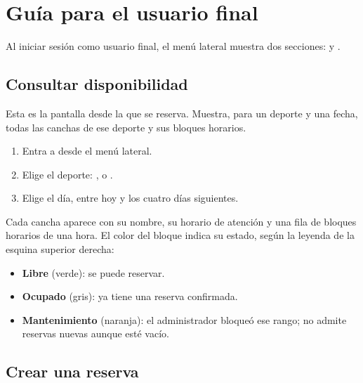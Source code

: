 
\section{Guía para el usuario final}
\label{sec:usuario-final}

Al iniciar sesión como usuario final, el menú lateral muestra dos
secciones:  y .

\subsection{Consultar disponibilidad}
\label{sec:usuario:disponibilidad}

Esta es la pantalla desde la que se reserva. Muestra, para un deporte y una
fecha, todas las canchas de ese deporte y sus bloques horarios.

\begin{enumerate}
  \item Entra a  desde el menú lateral.
  \item Elige el deporte: ,  o .
  \item Elige el día, entre hoy y los cuatro días siguientes.
\end{enumerate}


Cada cancha aparece con su nombre, su horario de atención y una fila de
bloques horarios de una hora. El color del bloque indica su estado, según
la leyenda de la esquina superior derecha:

\begin{itemize}
  \item \textbf{Libre} (verde): se puede reservar.
  \item \textbf{Ocupado} (gris): ya tiene una reserva confirmada.
  \item \textbf{Mantenimiento} (naranja): el administrador bloqueó ese
        rango; no admite reservas nuevas aunque esté vacío.
\end{itemize}

\subsection{Crear una reserva}
\label{sec:usuario:reservar}

